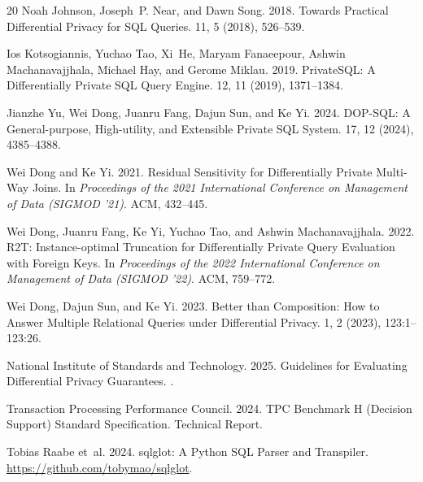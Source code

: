 \documentclass[sigconf,nonacm]{acmart}
\begin{document}
\begin{thebibliography}{20}
Noah Johnson, Joseph~P. Near, and Dawn Song. 2018.
\newblock Towards Practical Differential Privacy for SQL Queries.
 11, 5 (2018), 526--539.

Ios Kotsogiannis, Yuchao Tao, Xi~He, Maryam Fanaeepour, Ashwin Machanavajjhala, Michael Hay, and Gerome Miklau. 2019.
\newblock PrivateSQL: A Differentially Private SQL Query Engine.
 12, 11 (2019), 1371--1384.

Jianzhe Yu, Wei Dong, Juanru Fang, Dajun Sun, and Ke Yi. 2024.
\newblock DOP-SQL: A General-purpose, High-utility, and Extensible Private SQL System.
 17, 12 (2024), 4385--4388.

Wei Dong and Ke Yi. 2021.
\newblock Residual Sensitivity for Differentially Private Multi-Way Joins.
\newblock In {\em Proceedings of the 2021 International Conference on Management of Data (SIGMOD '21)}. ACM, 432--445.

Wei Dong, Juanru Fang, Ke Yi, Yuchao Tao, and Ashwin Machanavajjhala. 2022.
\newblock R2T: Instance-optimal Truncation for Differentially Private Query Evaluation with Foreign Keys.
\newblock In {\em Proceedings of the 2022 International Conference on Management of Data (SIGMOD '22)}. ACM, 759--772.

Wei Dong, Dajun Sun, and Ke Yi. 2023.
\newblock Better than Composition: How to Answer Multiple Relational Queries under Differential Privacy.
 1, 2 (2023), 123:1--123:26.

National Institute of Standards and Technology. 2025.
\newblock Guidelines for Evaluating Differential Privacy Guarantees.
.

Transaction Processing Performance Council. 2024.
\newblock TPC Benchmark H (Decision Support) Standard Specification.
\newblock Technical Report.

Tobias Raabe et~al. 2024.
\newblock sqlglot: A Python SQL Parser and Transpiler.
\newblock \url{https://github.com/tobymao/sqlglot}.

\end{thebibliography}
\end{document}
